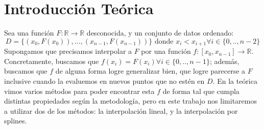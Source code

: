 \documentclass{article}
\begin{document}
{} %


 
\maketitle

\pagebreak

\tableofcontents

\pagebreak

\section{Introducción Teórica}

Sea una función $F: \mathbb{R} \to \mathbb{R}$ desconocida, y un conjunto de datos ordenado: $$D = \{(x_0, F(x_0)), ..., (x_{n-1}, F(x_{n-1}))\} \text{ donde } x_i < x_{i+1} \forall i \in \{0, .., n-2\}$$
Supongamos que precisamos interpolar a $F$ por una función $f: [x_0, x_{n-1}] \to \mathbb{R}$. Concretamente, buscamos que $f(x_i) = F(x_i) \forall i \in \{0, .., n-1\}$; además, buscamos que $f$ de alguna forma logre generalizar bien, que logre parecerse a $F$ inclusive cuando la evaluemos en nuevos puntos que no estén en $D$. En la teórica vimos varios métodos para poder encontrar esta $f$ de forma tal que cumpla distintas propiedades según la metodología, pero en este trabajo nos limitaremos a utilizar dos de los métodos: la interpolación lineal, y la interpolación por splines.
\end{document}

